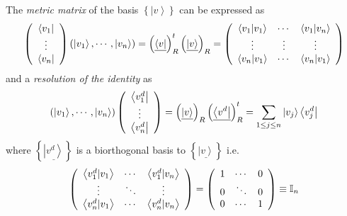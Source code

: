 \documentclass[aps,preprint]{revtex4}%
\begin{document}
The \emph{metric matrix} of the basis $\left\{  \left\vert v\right\rangle
\right\}  $ can be expressed as
\begin{equation}
\left(
\begin{array}
[c]{c}%
\left\langle v_{1}\right\vert \\
\vdots\\
\left\langle v_{n}\right\vert
\end{array}
\right)  \left(  \left\vert v_{1}\right\rangle ,\cdots,\left\vert
v_{n}\right\rangle \right)  =\left(  \underline{\left\langle v\right\vert
}\right)  _{R}^{t}\left(  \underline{\left\vert v\right\rangle }\right)
_{R}=\left(
\begin{array}
[c]{ccc}%
\left\langle v_{1}|v_{1}\right\rangle  & \cdots & \left\langle v_{1}%
|v_{n}\right\rangle \\
\vdots & \vdots & \vdots\\
\left\langle v_{n}|v_{1}\right\rangle  & \cdots & \left\langle v_{n}%
|v_{1}\right\rangle
\end{array}
\right)
\end{equation}
and a \emph{resolution of the identity} as
\begin{equation}
\left(  \left\vert v_{1}\right\rangle ,\cdots,\left\vert v_{n}\right\rangle
\right)  \left(
\begin{array}
[c]{c}%
\left\langle v_{1}^{d}\right\vert \\
\vdots\\
\left\langle v_{n}^{d}\right\vert
\end{array}
\right)  =\left(  \underline{\left\vert v\right\rangle }\right)  _{R}\left(
\underline{\left\langle v^{d}\right\vert }\right)  _{R}^{t}=%
{\displaystyle\sum\limits_{1\leq j\leq n}}
\left\vert v_{j}\right\rangle \left\langle v_{j}^{d}\right\vert
\end{equation}
where $\left\{  \underline{\left\vert v^{d}\right\rangle }\right\}  $ is a
biorthogonal basis to $\left\{  \underline{\left\vert v\right\rangle
}\right\}  $ i.e.
\begin{equation}
\left(
\begin{array}
[c]{ccc}%
\left\langle v_{1}^{d}|v_{1}\right\rangle  & \cdots & \left\langle v_{1}%
^{d}|v_{n}\right\rangle \\
\vdots & \ddots & \vdots\\
\left\langle v_{n}^{d}|v_{1}\right\rangle  & \cdots & \left\langle v_{n}%
^{d}|v_{n}\right\rangle
\end{array}
\right)  =\left(
\begin{array}
[c]{ccc}%
1 & \cdots & 0\\
0 & \ddots & 0\\
0 & \cdots & 1
\end{array}
\right)  \equiv\mathbb{I}_{n}%
\end{equation}
\end{document}
